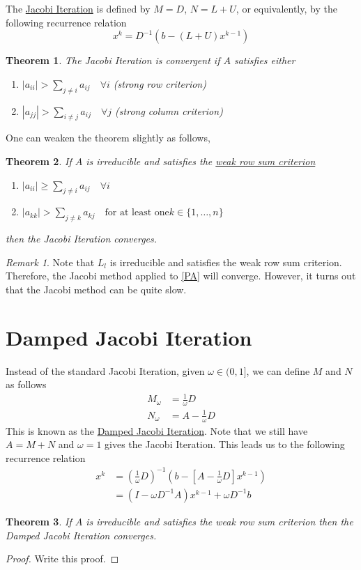 \documentclass[a4paper,10pt,oneside]{book}
\theoremstyle{plain}%
\newtheorem{thm}{Theorem}[section]
\theoremstyle{definition}
\theoremstyle{remark}
\newtheorem*{rem}{Remark}
\newcommand{\Ll}{L_l}
\begin{document}
The \underline{Jacobi Iteration} is defined by $M=D$, $N=L+U$, or equivalently,
by the following recurrence relation
\begin{equation}
 x^k=D^{-1}\left(b-\left(L+U\right)x^{k-1}\right)
\end{equation}
\begin{thm}
 The Jacobi Iteration is convergent if $A$ satisfies either
 \begin{enumerate}
  \item $|a_{ii}|>\sum_{j\neq i}a_{ij}\quad\forall i$ (strong row criterion)
  \item $|a_{jj}|>\sum_{i\neq j}a_{ij}\quad\forall j$ (strong column criterion)
 \end{enumerate}
\end{thm}
One can weaken the theorem slightly as follows,
\begin{thm}
 If $A$ is irreducible and satisfies the \underline{weak row sum criterion}
 \begin{enumerate}
  \item $|a_{ii}|\geq\sum_{j\neq i}a_{ij}\quad\forall i$
  \item $|a_{kk}|>\sum_{j\neq k}a_{kj}\quad\text{for at least one
}k\in\{1,\dotsc,n\}$
 \end{enumerate}
 then the Jacobi Iteration converges.
\end{thm}
\begin{rem}
 Note that $\Ll$ is irreducible and satisfies the weak row sum criterion.
Therefore, the Jacobi method applied to \eqref{PA} will converge. However, it
turns out that the Jacobi method can be quite slow.
\end{rem}

\section{Damped Jacobi Iteration}
Instead of the standard Jacobi Iteration, given $\omega\in(0,1]$, we can define
$M$ and $N$ as follows
\begin{align}
 M_\omega&=\frac{1}{\omega}D\\
 N_\omega&=A-\frac{1}{\omega}D
\end{align}
This is known as the \underline{Damped Jacobi Iteration}. Note that we still
have $A=M+N$ and $\omega=1$ gives the Jacobi Iteration. This leads us to the 
following recurrence relation
\begin{align}
 x^k&=\left(\frac{1}{\omega}D\right)^{-1}\left(b-\left[A-\frac{1}{\omega}D\right
]x^{k-1}\right)\\
        &=\left(I-\omega D^{-1}A\right)x^{k-1}+\omega D^{-1}b
\end{align}
\begin{thm}
 If $A$ is irreducible and satisfies the weak row sum criterion then the Damped
Jacobi Iteration converges.
\end{thm}
\begin{proof}
 Write this proof.
\end{proof}
\end{document}
